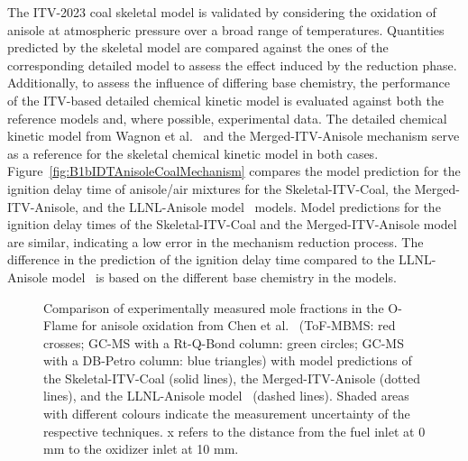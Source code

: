 \begin{refsection}
The ITV-2023 coal skeletal model is validated by considering the oxidation of anisole at atmospheric pressure over a broad range of temperatures. Quantities predicted by the skeletal model are compared against the ones of the corresponding detailed model to assess the effect induced by the reduction phase. Additionally, to assess the influence of differing base chemistry, the performance of the ITV-based detailed chemical kinetic model is evaluated against both the reference models and, where possible, experimental data. The detailed chemical kinetic model from Wagnon et al.~\cite{Wagnon2018} and the Merged-ITV-Anisole mechanism serve as a reference for the skeletal chemical kinetic model in both cases.
\\
Figure~\ref{fig:B1bIDTAnisoleCoalMechanism} compares the model prediction for the ignition delay time of anisole/air mixtures for the Skeletal-ITV-Coal, the Merged-ITV-Anisole, and the LLNL-Anisole model~\cite{Wagnon2018} models. Model predictions for the ignition delay times of the Skeletal-ITV-Coal and the Merged-ITV-Anisole model are similar, indicating a low error in the mechanism reduction process. The difference in the prediction of the ignition delay time compared to the LLNL-Anisole model~\cite{Wagnon2018} is based on the different base chemistry in the models.
\begin{figure}[b]
  \centering
  \hfill
  \hfill
  \caption{Comparison of experimentally measured mole fractions in the O-Flame for anisole oxidation from Chen et al.~\cite{Chen2022} (ToF-MBMS: red crosses; GC-MS with a Rt-Q-Bond column: green circles; GC-MS with a DB-Petro column: blue triangles) with model predictions of the Skeletal-ITV-Coal (solid lines), the Merged-ITV-Anisole (dotted lines), and the LLNL-Anisole model~\cite{Wagnon2018} (dashed lines). Shaded areas with different colours indicate the measurement uncertainty of the respective techniques. x refers to the distance from the fuel inlet at 0 mm to the oxidizer inlet at 10 mm.}
  \label{fig:B1bAnisoleOxidationCoalMechanismCO2O}
\end{figure}
\\

\end{refsection}
